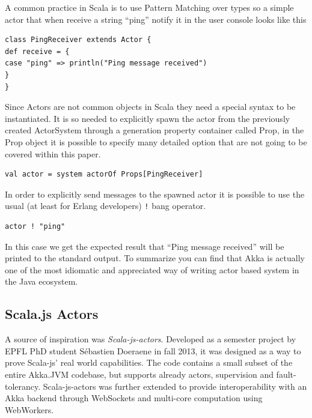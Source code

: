 \documentclass{sig-alternate}
\begin{document}
A common practice in Scala is to use Pattern Matching over types so a simple actor that when receive a string ``ping'' notify it in the user console looks like this
\begin{lstlisting}
class PingReceiver extends Actor {
def receive = {
case "ping" => println("Ping message received")
}
}
\end{lstlisting}

Since Actors are not common objects in Scala they need a special syntax to be instantiated.
It is so needed to explicitly spawn the actor from the previously created ActorSystem through a generation property container called Prop, in the Prop object it is possible to specify many detailed option that are not going to be covered within this paper.
\begin{lstlisting}
val actor = system actorOf Props[PingReceiver]
\end{lstlisting}

In order to explicitly send messages to the spawned actor it is possible to use the usual (at least for Erlang developers) \verb|!| bang operator.
\begin{lstlisting}
actor ! "ping"
\end{lstlisting}

In this case we get the expected result that ``Ping message received'' will be printed to the standard output.
To summarize you can find that Akka is actually one of the most idiomatic and appreciated way of writing actor based system in the Java ecosystem.

\subsection{Scala.js Actors}

A source of inspiration was \textit{Scala-js-actors}.
Developed as a semester project by EPFL PhD student Sébastien Doeraene in fall 2013, it was designed as a way to prove Scala-js' real world capabilities.
The code contains a small subset of the entire Akka.JVM codebase, but supports already actors, supervision and fault-tolerancy.
Scala-js-actors was further extended to provide interoperability with an Akka backend through WebSockets and multi-core computation using WebWorkers.
\end{document}
